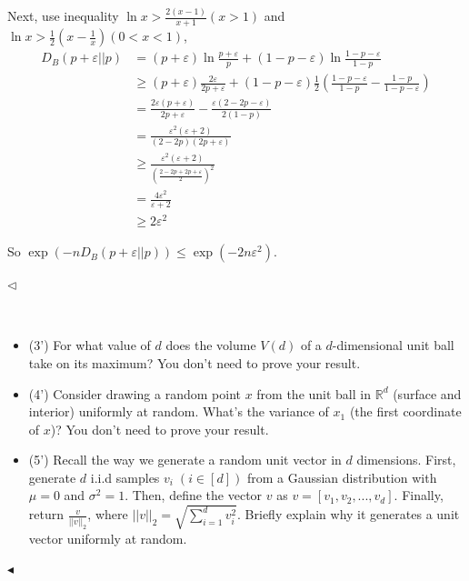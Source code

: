 \documentclass[11pt]{article}
\newenvironment{problem}[2][Problem]{\begin{trivlist}
\item[\hskip \labelsep {\bfseries #1}\hskip \labelsep {\bfseries #2.}]}{\hfill$\blacktriangleleft$\end{trivlist}}
\newenvironment{answer}[1][Answer]{\begin{trivlist}
\item[\hskip \labelsep {\bfseries #1.}\hskip \labelsep]}{\hfill$\lhd$\end{trivlist}}
\begin{document}
\begin{answer}
\begin{itemize}
    Next, use inequality $\ln x > \frac{2(x - 1)}{x + 1}(x > 1)$ and $\ln x > \frac{1}{2}(x - \frac{1}{x})(0 < x < 1)$,
    \[\begin{aligned}
        D_B(p+\varepsilon||p) &= (p + \varepsilon)\ln\frac{p+\varepsilon}{p} + (1-p-\varepsilon)\ln\frac{1-p-\varepsilon}{1-p} \\
        &\ge (p+\varepsilon)\frac{2\varepsilon}{2p+\varepsilon} + (1-p-\varepsilon)\frac{1}{2}\left(\frac{1-p-\varepsilon}{1-p} - \frac{1-p}{1-p-\varepsilon}\right) \\
        &= \frac{2\varepsilon(p+\varepsilon)}{2p+\varepsilon} - \frac{\varepsilon(2-2p-\varepsilon)}{2(1-p)} \\
        &= \frac{\varepsilon^2(\varepsilon+2)}{(2-2p)(2p+\varepsilon)} \\
        &\ge \frac{\varepsilon^2(\varepsilon+2)}{\left(\frac{2-2p+2p+\varepsilon}{2}\right)^2} \\
        &= \frac{4\varepsilon^2}{\varepsilon+2} \\
        &\ge 2\varepsilon^2
    \end{aligned}\]

    So $\exp(-n D_B(p+\varepsilon||p)) \le \exp(-2n\varepsilon^2)$.
    
\end{itemize}
\end{answer}



\begin{problem}{5 (12')} ~
\begin{itemize}
    \item [(1)] (3') For what value of $d$ does the volume $V(d)$ of a $d$-dimensional unit ball take on its maximum? You don't need to prove your result.
    \item [(2)] (4') Consider drawing a random point $x$ from the unit ball in $\mathbb{R}^d$ (surface and interior) uniformly at random. What's the variance of $x_1$ (the first coordinate of $x$)? You don't need to prove your result.
    \item [(3)] (5') Recall the way we generate a random unit vector in $d$ dimensions. First, generate $d$ i.i.d samples $v_i\;(i\in [d])$ from a Gaussian distribution with $\mu=0$ and $\sigma^2=1$. Then, define the vector $v$ as $v=[v_1,v_2,...,v_d]$. Finally, return $\frac{v}{||v||_2}$, where $||v||_2=\sqrt{\sum_{i=1}^d v_i^2}$. Briefly explain why it generates a unit vector uniformly at random.
\end{itemize}
\end{problem}
\end{document}
